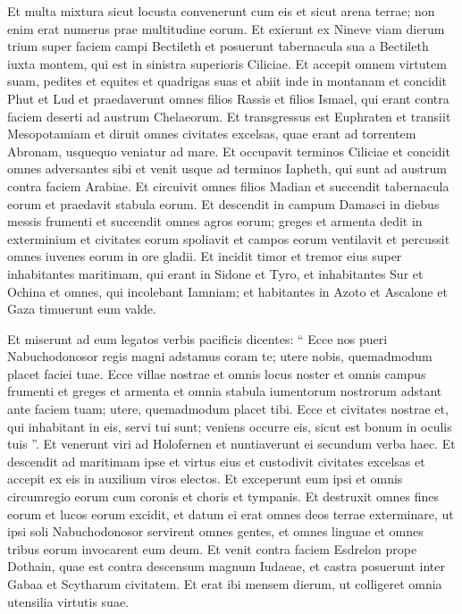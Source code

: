 \begin{biblechapter}
\begin{biblechapter}
\verse Et multa mixtura sicut locusta convenerunt cum eis et sicut arena terrae; non enim erat numerus prae multitudine eorum. 
\verse Et exierunt ex Nineve viam dierum trium super faciem campi Bectileth et posuerunt tabernacula sua a Bectileth iuxta montem, qui est in sinistra superioris Ciliciae. 
\verse Et accepit omnem virtutem suam, pedites et equites et quadrigas suas et abiit inde in montanam 
 \verse et concidit Phut et Lud et praedaverunt omnes filios Rassis et filios Ismael, qui erant contra faciem deserti ad austrum Chelaeorum. 
\verse Et transgressus est Euphraten et transiit Mesopotamiam et diruit omnes civitates excelsas, quae erant ad torrentem Abronam, usquequo veniatur ad mare. 
\verse Et occupavit terminos Ciliciae et concidit omnes adversantes sibi et venit usque ad terminos Iapheth, qui sunt ad austrum contra faciem Arabiae. 
\verse Et circuivit omnes filios Madian et succendit tabernacula eorum et praedavit stabula eorum. 
\verse Et descendit in campum Damasci in diebus messis frumenti et succendit omnes agros eorum; greges et armenta dedit in exterminium et civitates eorum spoliavit et campos eorum ventilavit et percussit omnes iuvenes eorum in ore gladii. 
 \verse Et incidit timor et tremor eius super inhabitantes maritimam, qui erant in Sidone et Tyro, et inhabitantes Sur et Ochina et omnes, qui incolebant Iamniam; et habitantes in Azoto et Ascalone et Gaza timuerunt eum valde.
 
\begin{biblechapter}
\verse Et miserunt ad eum legatos verbis pacificis dicentes: 
\verse “ Ecce nos pueri Nabuchodonosor regis magni adstamus coram te; utere nobis, quemadmodum placet faciei tuae. 
\verse Ecce villae nostrae et omnis locus noster et omnis campus frumenti et greges et armenta et omnia stabula iumentorum nostrorum adstant ante faciem tuam; utere, quemadmodum placet tibi. 
\verse Ecce et civitates nostrae et, qui inhabitant in eis, servi tui sunt; veniens occurre eis, sicut est bonum in oculis tuis ”. 
\verse Et venerunt viri ad Holofernen et nuntiaverunt ei secundum verba haec. 
\verse Et descendit ad maritimam ipse et virtus eius et custodivit civitates excelsas et accepit ex eis in auxilium viros electos. 
\verse Et exceperunt eum ipsi et omnis circumregio eorum cum coronis et choris et tympanis. 
\verse Et destruxit omnes fines eorum et lucos eorum excidit, et datum ei erat omnes deos terrae exterminare, ut ipsi soli Nabuchodonosor servirent omnes gentes, et omnes linguae et omnes tribus eorum invocarent eum deum. 
\verse Et venit contra faciem Esdrelon prope Dothain, quae est contra descensum magnum Iudaeae, 
\verse et castra posuerunt inter Gabaa et Scytharum civitatem. Et erat ibi mensem dierum, ut colligeret omnia utensilia virtutis suae.
 

\end{biblechapter}
\end{biblechapter}
\end{biblechapter}
